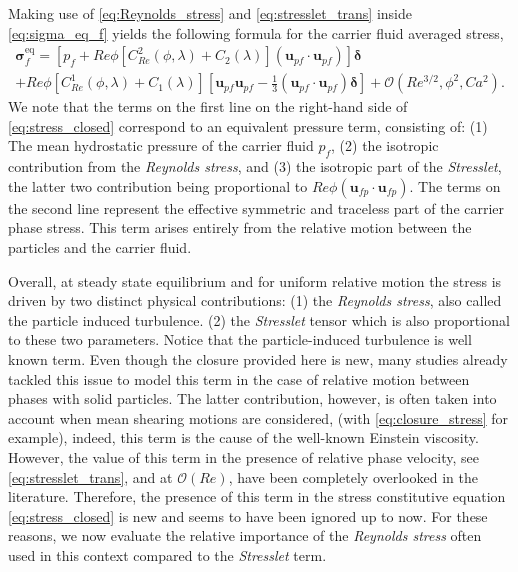 Making use of \ref{eq:Reynolds_stress} and \ref{eq:stresslet_trans} inside \ref{eq:sigma_eq_f} yields the following formula for the carrier fluid averaged stress, 
\begin{multline*}
    \bm{\sigma}^\text{eq}_f = 
    \left[ p_f + Re \phi  [C_{Re}^2(\phi,\lambda) + C_2(\lambda)](\textbf{u}_{pf}\cdot \textbf{u}_{pf}) \right]\bm\delta \\
    + Re \phi [C_{Re}^1(\phi,\lambda) + C_1(\lambda)]\left[
            \textbf{u}_{pf}\textbf{u}_{pf}
            - \frac{1}{3}(\textbf{u}_{pf}\cdot \textbf{u}_{pf})\bm\delta
    \right]
    + \mathcal{O}(Re^{3/2},\phi^2, Ca^2 ).
    \label{eq:stress_closed}
\end{multline*} 
We note that the terms on the first line on the right-hand side of \ref{eq:stress_closed} correspond to an equivalent pressure term, consisting of:  
(1) The mean hydrostatic pressure of the carrier fluid $p_f$, 
(2) the isotropic contribution from the \textit{Reynolds stress}, and 
(3) the isotropic part of the \textit{Stresslet}, the latter two contribution being proportional to $Re \phi (\textbf{u}_{fp}\cdot \textbf{u}_{fp})$.  
The terms on the second line represent the effective symmetric and traceless part of the carrier phase stress. 
This term arises entirely from the relative motion between the particles and the carrier fluid. 



Overall, at steady state equilibrium and for uniform relative motion the stress is driven by two distinct physical contributions: 
(1) the \textit{Reynolds stress}, also called the particle induced turbulence. 
(2) the \textit{Stresslet} tensor which is also proportional to these two parameters. 
Notice that the particle-induced turbulence is well known term. 
Even though the closure provided here is new, many studies already tackled this issue to model this term in the case of relative motion between phases with solid particles. 
The latter contribution, however, is often taken into account when mean shearing motions are considered, (with \ref{eq:closure_stress} for example), indeed, this term is the cause of the well-known Einstein viscosity. 
However, the value of this term in the presence of relative phase velocity, see \ref{eq:stresslet_trans},  and at $\mathcal{O}(Re)$, have been completely overlooked in the literature. 
Therefore, the presence of this term in the stress constitutive equation \eqref{eq:stress_closed}  is new and seems to have been ignored up to now. 
For these reasons, we now evaluate the relative importance of the \textit{Reynolds stress} often used in this context compared to the \textit{Stresslet} term. 

